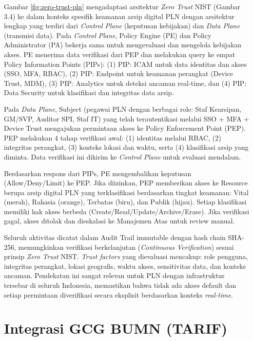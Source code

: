 \documentclass[12pt,a4paper]{report}
\begin{document}
\small Gambar \ref{fig:zero-trust-pln} mengadaptasi arsitektur \textit{Zero Trust} NIST (Gambar 3.4) ke dalam konteks spesifik keamanan arsip digital PLN dengan arsitektur lengkap yang terdiri dari \textit{Control Plane} (keputusan kebijakan) dan \textit{Data Plane} (transmisi data). Pada \textit{Control Plane}, Policy Engine (PE) dan Policy Administrator (PA) bekerja sama untuk mengevaluasi dan mengelola kebijakan akses. PE menerima data verifikasi dari PEP dan melakukan query ke empat Policy Information Points (PIPs): (1) PIP: ICAM untuk data identitas dan akses (SSO, MFA, RBAC), (2) PIP: Endpoint untuk keamanan perangkat (Device Trust, MDM), (3) PIP: Analytics untuk deteksi ancaman real-time, dan (4) PIP: Data Security untuk klasifikasi dan integritas data arsip.

Pada \textit{Data Plane}, Subject (pegawai PLN dengan berbagai role: Staf Kearsipan, GM/SVP, Auditor SPI, Staf IT) yang telah terautentikasi melalui SSO + MFA + Device Trust mengajukan permintaan akses ke Policy Enforcement Point (PEP). PEP melakukan 4 tahap verifikasi awal: (1) identitas melalui RBAC, (2) integritas perangkat, (3) konteks lokasi dan waktu, serta (4) klasifikasi arsip yang diminta. Data verifikasi ini dikirim ke \textit{Control Plane} untuk evaluasi mendalam.

Berdasarkan respons dari PIPs, PE mengembalikan keputusan (Allow/Deny/Limit) ke PEP. Jika diizinkan, PEP memberikan akses ke Resource berupa arsip digital PLN yang terklasifikasi berdasarkan tingkat keamanan: Vital (merah), Rahasia (orange), Terbatas (biru), dan Publik (hijau). Setiap klasifikasi memiliki hak akses berbeda (Create/Read/Update/Archive/Erase). Jika verifikasi gagal, akses ditolak dan dieskalasi ke Manajemen Atas untuk review manual.

Seluruh aktivitas dicatat dalam Audit Trail immutable dengan hash chain SHA-256, memungkinkan verifikasi berkelanjutan (\textit{Continuous Verification}) sesuai prinsip \textit{Zero Trust} NIST. \textit{Trust factors} yang dievaluasi mencakup: role pengguna, integritas perangkat, lokasi geografis, waktu akses, sensitivitas data, dan konteks ancaman. Pendekatan ini sangat relevan untuk PLN dengan infrastruktur tersebar di seluruh Indonesia, memastikan bahwa tidak ada akses default dan setiap permintaan diverifikasi secara eksplisit berdasarkan konteks \textit{real-time}.

\section{Integrasi GCG BUMN (TARIF)}
\end{document}
